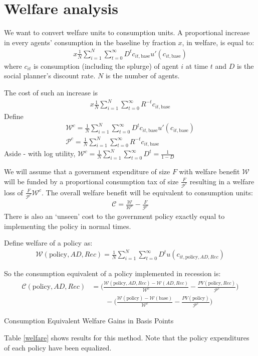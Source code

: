\documentclass[../HAFiscal]{subfiles}
\begin{document}
\section{Welfare analysis}

We want to convert welfare units to consumption units. A proportional increase in every agents' consumption in the baseline by fraction $x$, in welfare, is equal to:
\begin{align}
x\frac{1}{N}\sum_{i=1}^{N} \sum_{t=0}^{\infty} D^t c_{it,\text{base}} u'(c_{it,\text{base}})
\end{align}
where $c_{it}$ is consumption (including the splurge) of agent $i$ at time $t$ and $D$ is the social planner's discount rate. $N$ is the number of agents.


The cost of such an increase is
\begin{align}
x\frac{1}{N}\sum_{i=1}^{N} \sum_{t=0}^{\infty} R^{-t} c_{it,\text{base}}
\end{align}
Define
\begin{align}
\mathcal{W}^c =\frac{1}{N}\sum_{i=1}^{N} \sum_{t=0}^{\infty} D^t c_{it,\text{base}} u'(c_{it,\text{base}}) \\
\mathcal{P}^c = \frac{1}{N}\sum_{i=1}^{N} \sum_{t=0}^{\infty} R^{-t} c_{it,\text{base}}
\end{align}
Aside - with log utility, $\mathcal{W}^c =\frac{1}{N}\sum_{i=1}^{N} \sum_{t=0}^{\infty} D^t = \frac{1}{1-D}$

We will assume that a government expenditure of size $F$ with welfare benefit $\mathcal{W}$ will be funded by a proportional consumption tax of size $\frac{F}{\mathcal{P}^c}$ resulting in a welfare loss of $\frac{F}{\mathcal{P}^c}\mathcal{W}^c$. The overall welfare benefit will be equivalent to consumption units:
\begin{align}
\mathcal{C} = \frac{\mathcal{W}}{\mathcal{W}^c} - \frac{F}{\mathcal{P}^c}
\end{align}
There is also an `unseen' cost to the government policy exactly equal to implementing the policy in normal times.

Define welfare of a policy as:
\begin{align}
\mathcal{W}(\text{policy},AD,Rec) = \frac{1}{N}\sum_{i=1}^{N} \sum_{t=0}^{\infty} D^t u(c_{it,\text{policy},AD,Rec})
\end{align}

So the consumption equivalent of a policy implemented in recession is:
\begin{align}
\mathcal{C}(\text{policy},AD,Rec) &= \bigg(\frac{\mathcal{W}(\text{policy},AD,Rec)-\mathcal{W}(AD,Rec)}{\mathcal{W}^c} - \frac{PV(\text{policy},Rec)}{\mathcal{P}^c} \bigg)\\ \nonumber
& \qquad -
\bigg(\frac{\mathcal{W}(\text{policy}) - \mathcal{W}(\text{base})}{\mathcal{W}^c} - \frac{PV(\text{policy})}{\mathcal{P}^c} \bigg)
\end{align}

\begin{table} 
	\center
	
	\caption{Consumption Equivalent Welfare Gains in Basis Points }
	\label{welfare}
\end{table}

Table \ref{welfare} shows results for this method. Note that the policy expenditures of each policy have been equalized.
\end{document}
